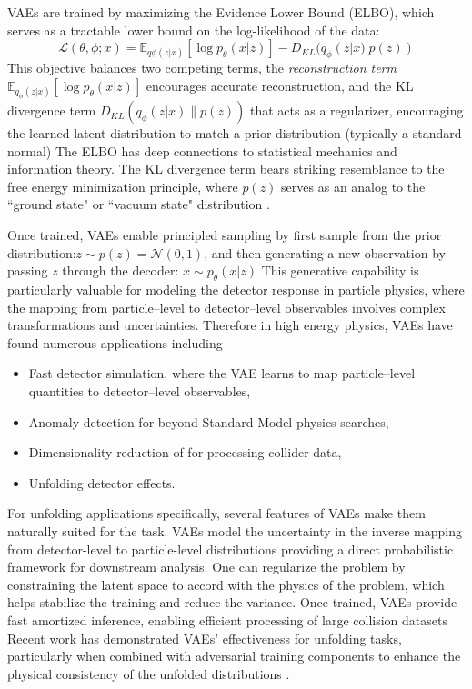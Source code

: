         VAEs are trained by maximizing the Evidence Lower Bound (ELBO), which serves as a tractable lower bound on the log-likelihood of the data:
        \begin{equation}
            \mathcal{L}(\theta, \phi; x) = \mathbb{E}_{q{\phi}(z|x)}[\log p_{\theta}(x|z)] - D_{KL}(q_{\phi}(z|x) | p(z))
        \end{equation}
        This objective balances two competing terms, the \emph{reconstruction term} \(\mathbb{E}_{q_{\phi}(z|x)}[\log p_{\theta}(x|z)]\) encourages accurate reconstruction, and the KL divergence term \(D_{KL}(q_{\phi}(z|x) \| p(z))\) that acts as a regularizer, encouraging the learned latent distribution to match a prior distribution (typically a standard normal)
        The ELBO has deep connections to statistical mechanics and information theory.
        The KL divergence term bears striking resemblance to the free energy minimization principle, where \(p(z)\) serves as an analog to the ``ground state" or ``vacuum state" distribution .

        Once trained, VAEs enable principled sampling by first sample from the prior distribution:\(z \sim p(z) = \mathcal{N}(0, 1)\), and then generating a new observation by passing \(z\) through the decoder: \(x \sim p_{\theta}(x|z)\)
        This generative capability is particularly valuable for modeling the detector response in particle physics, where the mapping from particle--level to detector--level observables involves complex transformations and uncertainties.
        Therefore in high energy physics, VAEs have found numerous applications including
        \begin{itemize}
            \item Fast detector simulation, where the VAE learns to map particle--level quantities to detector--level observables, 
            \item Anomaly detection for beyond Standard Model physics searches,
            \item Dimensionality reduction of for processing collider data, 
            \item Unfolding detector effects.
        \end{itemize}
        For unfolding applications specifically, several features of VAEs make them naturally suited for the task.
        VAEs model the uncertainty in the inverse mapping from detector-level to particle-level distributions providing a direct probabilistic framework for downstream analysis.
        One can regularize the problem by constraining the latent space to accord with the physics of the problem, which helps stabilize the training and reduce the variance.
        Once trained, VAEs provide fast amortized inference, enabling efficient processing of large collision datasets
        Recent work has demonstrated VAEs' effectiveness for unfolding tasks, particularly when combined with adversarial training components to enhance the physical consistency of the unfolded distributions .

